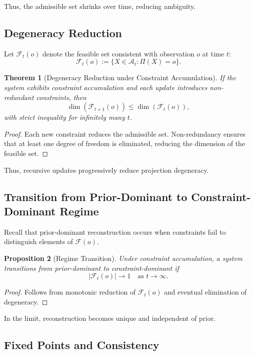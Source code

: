 \documentclass[12pt, oneside]{article}
\theoremstyle{plain}
\newtheorem{theorem}{Theorem}[section]
\newtheorem{proposition}[theorem]{Proposition}
\theoremstyle{definition}
\theoremstyle{remark}
\begin{document}
Thus, the admissible set shrinks over time, reducing ambiguity.

\subsection{Degeneracy Reduction}

Let $\mathcal{F}_t(o)$ denote the feasible set consistent with observation $o$ at time $t$:
\[
\mathcal{F}_t(o) := \{ X \in \mathcal{A}_t : \Pi(X) = o \}.
\]

\begin{theorem}[Degeneracy Reduction under Constraint Accumulation]
If the system exhibits constraint accumulation and each update introduces non-redundant constraints, then
\[
\dim(\mathcal{F}_{t+1}(o)) \le \dim(\mathcal{F}_t(o)),
\]
with strict inequality for infinitely many $t$.
\end{theorem}

\begin{proof}
Each new constraint reduces the admissible set. Non-redundancy ensures that at least one degree of freedom is eliminated, reducing the dimension of the feasible set.
\end{proof}

Thus, recursive updates progressively reduce projection degeneracy.

\subsection{Transition from Prior-Dominant to Constraint-Dominant Regime}

Recall that prior-dominant reconstruction occurs when constraints fail to distinguish elements of $\mathcal{F}(o)$.

\begin{proposition}[Regime Transition]
Under constraint accumulation, a system transitions from prior-dominant to constraint-dominant if
\[
|\mathcal{F}_t(o)| \to 1 \quad \text{as } t \to \infty.
\]
\end{proposition}

\begin{proof}
Follows from monotonic reduction of $\mathcal{F}_t(o)$ and eventual elimination of degeneracy.
\end{proof}

In the limit, reconstruction becomes unique and independent of prior.

\subsection{Fixed Points and Consistency}
\end{document}
